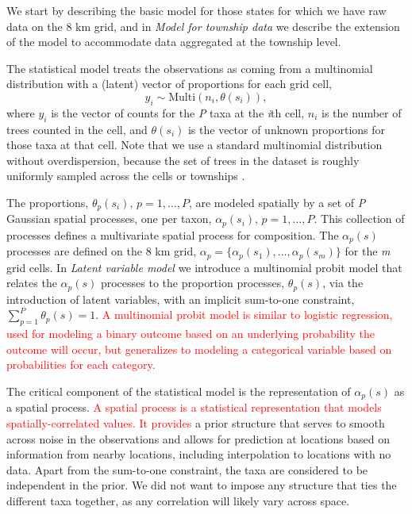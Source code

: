 \documentclass[10pt,letterpaper]{article}
\begin{document}
We start by describing the basic model for those states for which
we have raw data on the 8 km grid, and in \emph{Model for township data}
we describe the extension of the model to accommodate data aggregated
at the township level.

The statistical model treats the observations as coming from a multinomial
distribution with a (latent) vector of proportions for each grid cell,
\[
y_{i}\sim\mbox{Multi}(n_{i},\theta(s_{i})),
\]
where $y_{i}$ is the vector of counts for the  \emph{P} taxa at the \emph{i}th
cell, $n_{i}$ is the number of trees counted in the cell, and $\theta(s_{i})$
is the vector of unknown proportions for those taxa at that cell.
Note that we use a standard multinomial distribution without overdispersion,
because the set of trees in the dataset is roughly uniformly sampled
across the cells or townships \cite{goring2015composition}.

The proportions, $\theta_{p}(s_{i}),\, p=1,\ldots,P$, are modeled
spatially by a set of \emph{P} Gaussian spatial processes, one per taxon,
$\alpha_{p}(s_{i}),\, p=1,\ldots,P$. This collection of processes
defines a multivariate spatial process for composition. The $\alpha_{p}(s)$
processes are defined on the 8 km grid, $\alpha_{p}=\{\alpha_{p}(s_{1}),\ldots,\alpha_{p}(s_{m})\}$
for the \emph{m} grid cells. In  \emph{Latent variable model}
we introduce a multinomial probit model that relates the $\alpha_{p}(s)$
processes to the proportion processes, $\theta_{p}(s)$, via the introduction
of latent variables, with an implicit sum-to-one constraint, $\sum_{p=1}^{P}\theta_{p}(s)=1$.
\textcolor{red}{A multinomial probit model is similar to logistic
regression, used for modeling a binary outcome based on an underlying
probability the outcome will occur, but generalizes to modeling a
categorical variable based on probabilities for each category. }



The critical component of the statistical model is the representation
of $\alpha_{p}(s)$ as a spatial process. \textcolor{red}{A spatial
process is a statistical representation that models spatially-correlated
values. It provides} a prior structure that serves to smooth across
noise in the observations and allows for prediction at locations based
on information from nearby locations, including interpolation to locations
with no data. Apart from the sum-to-one constraint, the taxa are considered
to be independent in the prior. We did not want to impose any structure
that ties the different taxa together, as any correlation will likely
vary across space.
\end{document}
